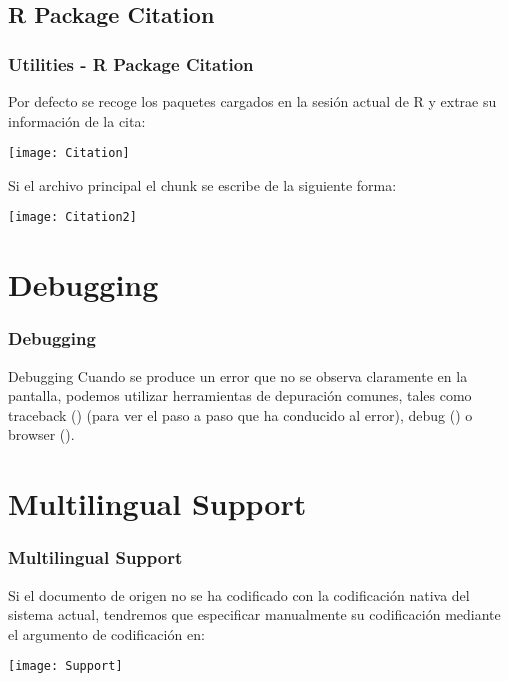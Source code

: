 \documentclass[11pt]{beamer}					%
\begin{document}
	\subsection{R Package Citation}
		\begin{frame}
			\frametitle{Utilities - R Package Citation}
				\begin{block}{Por defecto se recoge los paquetes cargados en la sesión actual de R y extrae su información de la cita:}
						\begin{center}
						\texttt{[image: Citation]} 
						\end{center}
				\end{block}
				\begin{block}{Si el archivo principal el chunk se escribe de la siguiente forma:}
					\begin{small}
						\begin{center}
						\texttt{[image: Citation2]} 
						\end{center}
					\end{small}
				\end{block}
		\end{frame}

\section{Debugging}
		\begin{frame}
			\frametitle{Debugging}
				\begin{block}{Debugging}
Cuando se produce un error que no se observa claramente en la pantalla, podemos utilizar herramientas de depuración comunes, tales como traceback () (para ver el paso a paso que ha conducido al error), debug () o browser ().
				\end{block}
		\end{frame}

\section{Multilingual Support}
		\begin{frame}
			\frametitle{Multilingual Support}
				\begin{block}{Si el documento de origen no se ha codificado con la codificación nativa del sistema actual, tendremos que especificar manualmente su codificación mediante el argumento de codificación en:}
						\begin{center}
						\texttt{[image: Support]} 
						\end{center}
				\end{block}
		\end{frame}
\end{document}
